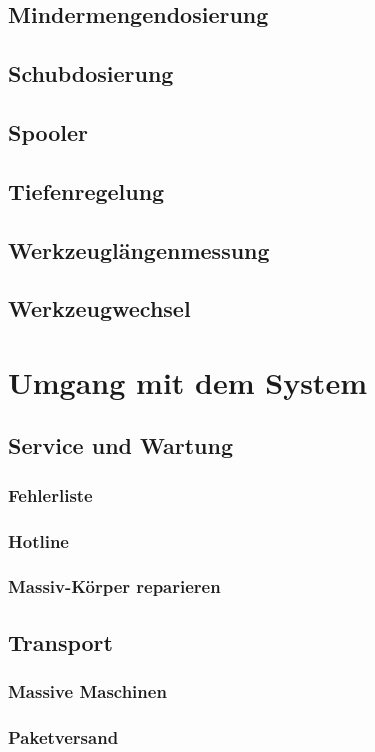 \documentclass[a4paper]{book}
\begin{document}
	\section{Mindermengendosierung} 
	\section{Schubdosierung} 
	\section{Spooler} 
	\section{Tiefenregelung} 
	\section{Werkzeuglängenmessung} 
	\section{Werkzeugwechsel} 

\chapter{Umgang mit dem System}
	\section{Service und Wartung} 
		\subsection{Fehlerliste} 
		\subsection{Hotline} 
		\subsection{Massiv-Körper reparieren} 
	\section{Transport} 
		\subsection{Massive Maschinen} 
		\subsection{Paketversand} 
 
\end{document}
